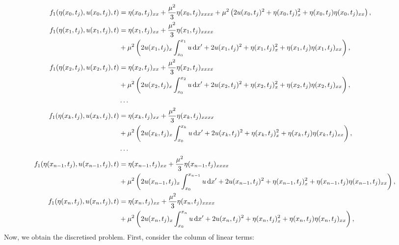 \documentclass[10pt,reqno,oneside,a4paper, landscape]{article}
\begin{document}
\begin{align*} f_1(\eta(x_0, t_j), u(x_0, t_j), t) &= \eta(x_0, t_j)_{xx} + \frac{\mu^2}{3} \eta(x_0, t_j)_{xxxx} + \mu^2 \left(2 u(x_0, t_j)^2 + \eta(x_0, t_j)^2_x + \eta(x_0, t_j)\eta(x_0, t_j)_{xx} \right), \\
f_1(\eta(x_1, t_j), u(x_1, t_j), t) &= \eta(x_1, t_j)_{xx} + \frac{\mu^2}{3} \eta(x_1, t_j)_{xxxx} \\
&+ \mu^2 \left(2 u(x_1, t_j)_{x} \int^{x_1}_{x_0} u \,\mathrm{d} x' + 2 u(x_1, t_j)^2 + \eta(x_1, t_j)^2_x + \eta(x_1, t_j)\eta(x_1, t_j)_{xx} \right), \\
f_1(\eta(x_2, t_j), u(x_2, t_j), t) &= \eta(x_2, t_j)_{xx} + \frac{\mu^2}{3} \eta(x_2, t_j)_{xxxx} \\
&+ \mu^2 \left(2 u(x_2, t_j)_{x} \int^{x_2}_{x_0} u \,\mathrm{d} x' + 2 u(x_2, t_j)^2 + \eta(x_2, t_j)^2_x + \eta(x_2, t_j)\eta(x_2, t_j)_{xx} \right), \\
&\ldots \\
f_1(\eta(x_k, t_j), u(x_k, t_j), t) &= \eta(x_k, t_j)_{xx} + \frac{\mu^2}{3} \eta(x_k, t_j)_{xxxx} \\
&+ \mu^2 \left( 2 u(x_k, t_j)_{x} \int^{x_k}_{x_0} u \,\mathrm{d} x' +2 u(x_k, t_j)^2 + \eta(x_k, t_j)^2_x + \eta(x_k, t_j)\eta(x_k, t_j)_{xx} \right), \\
&\ldots \\
f_1(\eta(x_{n-1}, t_j), u(x_{n-1}, t_j), t) &= \eta(x_{n-1}, t_j)_{xx} + \frac{\mu^2}{3} \eta(x_{n-1}, t_j)_{xxxx} \\
&+ \mu^2 \left( 2 u(x_{n-1}, t_j)_{x} \int^{x_{n-1}}_{x_0} u \,\mathrm{d} x' +2 u(x_{n-1}, t_j)^2 + \eta(x_{n-1}, t_j)^2_x + \eta(x_{n-1}, t_j)\eta(x_{n-1}, t_j)_{xx} \right), \\
f_1(\eta(x_{n}, t_j), u(x_{n}, t_j), t) &= \eta(x_{n}, t_j)_{xx} + \frac{\mu^2}{3} \eta(x_{n}, t_j)_{xxxx} \\
&+ \mu^2 \left( 2 u(x_{n}, t_j)_{x} \int^{x_{n}}_{x_0} u \,\mathrm{d} x' +2 u(x_{n}, t_j)^2 + \eta(x_{n}, t_j)^2_x + \eta(x_{n}, t_j)\eta(x_{n}, t_j)_{xx} \right),
\end{align*}
Now, we obtain the discretised problem. First, consider the column of linear terms:
\end{document}
